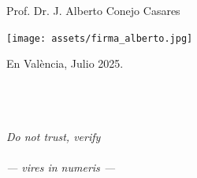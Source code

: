 \documentclass[11pt]{book}
\theoremstyle{definition}
\begin{document}
\vspace{1cm}


\begin{center}
Prof. Dr. J. Alberto Conejo Casares

\texttt{[image: assets/firma\_alberto.jpg]}

En València, Julio 2025.

\end{center}

\vfill

\pagebreak ~

\chapter*{}
\vspace*{1cm}
\begin{flushright}
\textit{Do not trust, verify ~~\\ ~ \\ --- vires in numeris ---}
\end{flushright}

\chapter*{}


\chapter*{}
\tableofcontents
\vfill
\pagebreak
\thispagestyle{almostempty}


\pagestyle{plain}

\vfill
\pagebreak
\newpage ~


\vfill
\pagebreak ~



\vfill
\pagebreak ~


\vfill
\pagebreak ~


\vfill
\pagebreak ~


\vfill
\pagebreak ~


\vfill
\pagebreak ~



\vfill
\pagebreak ~
  

\vfill
\pagebreak
\thispagestyle{almostempty}
\newpage ~
\end{document}
